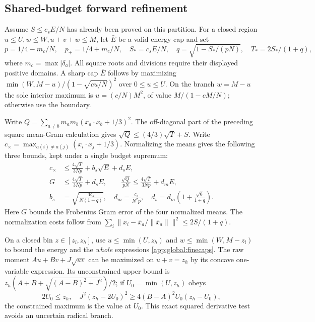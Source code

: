 \subsection{Shared-budget forward refinement}
Assume $S\le c_sE/N$ has already been proved on this partition. For a
closed region $u\le U,w\le W,u+v+w\le M$, let $\bar E$ be a valid
energy cap and set
\[
 p=1/4-m_c/N,\quad p_+=1/4+m_c/N,\quad
 S_*=c_s\bar E/N,\quad q=\sqrt{1-S_*/(pN)},\quad
 T_*=2S_* /(1+q),
\]
where $m_c=\max|\delta_a|$. All square roots and divisions require
their displayed positive domains. A sharp cap $\bar E$ follows by
maximizing $\min(W,M-u)/(1-\sqrt{cu/N})^2$ over $0\le u\le U$.
On the branch $w=M-u$ the sole interior maximum is
$u=(c/N)M^2$, of value $M/(1-cM/N)$; otherwise use the boundary.

Write
$Q=\sum_{a\ne b}m_am_b(\bar x_a\cdot\bar x_b+1/3)^2$.
The off-diagonal part of the preceding square mean-Gram calculation
gives $\sqrt Q\le(4/3)\sqrt T+S$. Write
$c_\times=\max_{a(i)\ne a(j)}(x_i\cdot x_j+1/3)$. Normalizing the
means gives the following three bounds, kept under a single budget supremum:
\begin{align}\label{app:global:finecaps}
 c_\times&\le\frac{4\sqrt T}{3Np}+b_s\sqrt E+d_sE,\\
 G&\le\frac{4\sqrt T}{3Np}+d_sE,\qquad
 \frac{\sqrt Q}{pN}\le\frac{4\sqrt T}{3Np}+d_mE,\nonumber\\
 b_s&=\sqrt{\frac{4c_s}{N(1+q)}},\quad
 d_m=\frac{c_s}{N^2p},\quad d_s=d_m\left(1+\frac{\sqrt6}{1+q}\right).
 \nonumber
\end{align}
Here $G$ bounds the Frobenius Gram error of the four normalized means.
The normalization costs follow from
$\sum_i\|x_i-\bar x_a/\|\bar x_a\|\|^2\le2S/(1+q)$.

On a closed bin $z\in[z_l,z_h]$, use
$u\le\min(U,z_h)$ and $w\le\min(W,M-z_l)$ to bound the energy and
the \emph{whole} expressions \eqref{app:global:finecaps}.
The raw moment $Au+Bv+J\sqrt{uv}$ can be maximized on $u+v=z_h$
by its concave one-variable expression. Its unconstrained upper bound
is $z_h(A+B+\sqrt{(A-B)^2+J^2})/2$; if $U_0=\min(U,z_h)$ obeys
\[
 2U_0\le z_h,\quad J^2(z_h-2U_0)^2
       \ge4(B-A)^2U_0(z_h-U_0),
\]
the constrained maximum is the value at $U_0$. This exact squared
derivative test avoids an uncertain radical branch.

